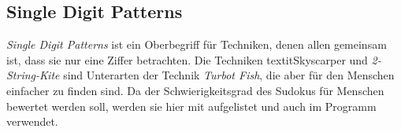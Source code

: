 \newpage
\subsection{Single Digit Patterns}
\textit{Single Digit Patterns} ist ein Oberbegriff für Techniken, denen allen gemeinsam ist, dass sie nur eine Ziffer betrachten. Die Techniken textit{Skyscarper} und \textit{2-String-Kite} sind Unterarten der Technik \textit{Turbot Fish}, die aber für den Menschen einfacher zu finden sind. Da der Schwierigkeitsgrad des Sudokus für Menschen bewertet werden soll, werden sie hier mit aufgelistet und auch im Programm verwendet.